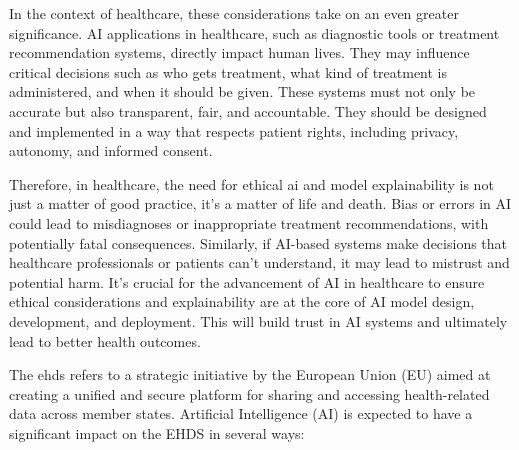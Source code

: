 In the context of healthcare, these considerations take on an even greater significance. AI applications in healthcare, such as diagnostic tools or treatment recommendation systems, directly impact human lives. They may influence critical decisions such as who gets treatment, what kind of treatment is administered, and when it should be given. These systems must not only be accurate but also transparent, fair, and accountable. They should be designed and implemented in a way that respects patient rights, including privacy, autonomy, and informed consent.

Therefore, in healthcare, the need for ethical \ac{ai} and model explainability is not just a matter of good practice, it's a matter of life and death. Bias or errors in AI could lead to misdiagnoses or inappropriate treatment recommendations, with potentially fatal consequences. Similarly, if AI-based systems make decisions that healthcare professionals or patients can't understand, it may lead to mistrust and potential harm. It's crucial for the advancement of AI in healthcare to ensure ethical considerations and explainability are at the core of AI model design, development, and deployment. This will build trust in AI systems and ultimately lead to better health outcomes.


The \ac{ehds} refers to a strategic initiative by the European Union (EU) aimed at creating a unified and secure platform for sharing and accessing health-related data across member states. Artificial Intelligence (AI) is expected to have a significant impact on the EHDS in several ways:

